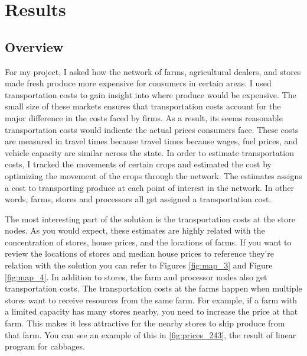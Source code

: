 \documentclass{report}
\begin{document}
\chapter{Results}

\section{Overview}

For my project, I asked how the network of farms, agricultural dealers, and stores made fresh produce more expensive for consumers in certain areas. I used transportation costs to gain insight into where produce would be expensive. The small size of these markets ensures that transportation costs account for the major difference in the costs faced by firms. As a result, its seems reasonable transportation costs would indicate the actual prices consumers face. These costs are measured in travel times because travel times because wages, fuel prices, and vehicle capacity are similar across the state. In order to estimate transportation costs, I tracked the movements of certain crops and estimated the cost by optimizing the movement of the crops through the network. The estimates assigns a cost to transporting produce at each point of interest in the network. In other words, farms, stores and processors all get assigned a transportation cost.

The most interesting part of the solution is the transportation costs at the store nodes. As you would expect, these estimates are highly related with the concentration of stores, house prices, and the locations of farms. If you want to review the locations of stores and median house prices to reference they're relation with the solution you can refer to Figures \ref{fig:map_3} and Figure \ref{fig:map_4}. In addition to stores, the farm and processor nodes also get transportation costs. The transportation costs at the farms happen when multiple stores want to receive resources from the same farm. For example, if a farm with a limited capacity has many stores nearby, you need to increase the price at that farm. This makes it less attractive for the nearby stores to ship produce from that farm. You can see an example of this in \ref{fig:prices_243}, the result of linear program for cabbages.
\end{document}
